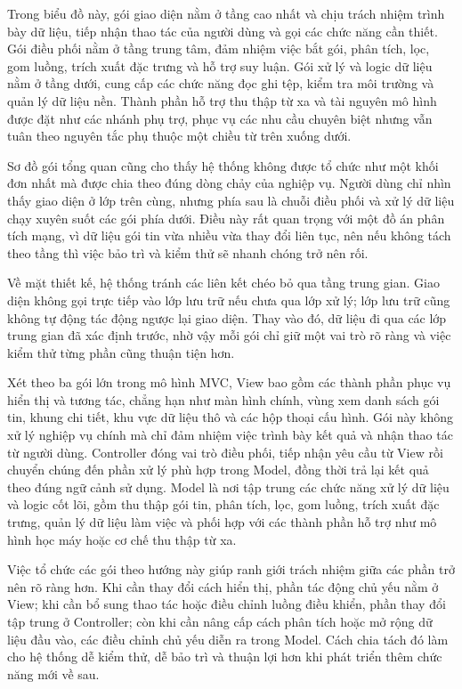 \documentclass[../DoAn.tex]{subfiles}
\begin{document}
Trong biểu đồ này, gói giao diện nằm ở tầng cao nhất và chịu trách nhiệm trình bày dữ liệu, tiếp nhận thao tác của người dùng và gọi các chức năng cần thiết. Gói điều phối nằm ở tầng trung tâm, đảm nhiệm việc bắt gói, phân tích, lọc, gom luồng, trích xuất đặc trưng và hỗ trợ suy luận. Gói xử lý và logic dữ liệu nằm ở tầng dưới, cung cấp các chức năng đọc ghi tệp, kiểm tra môi trường và quản lý dữ liệu nền. Thành phần hỗ trợ thu thập từ xa và tài nguyên mô hình được đặt như các nhánh phụ trợ, phục vụ các nhu cầu chuyên biệt nhưng vẫn tuân theo nguyên tắc phụ thuộc một chiều từ trên xuống dưới.

Sơ đồ gói tổng quan cũng cho thấy hệ thống không được tổ chức như một khối đơn nhất mà được chia theo đúng dòng chảy của nghiệp vụ. Người dùng chỉ nhìn thấy giao diện ở lớp trên cùng, nhưng phía sau là chuỗi điều phối và xử lý dữ liệu chạy xuyên suốt các gói phía dưới. Điều này rất quan trọng với một đồ án phân tích mạng, vì dữ liệu gói tin vừa nhiều vừa thay đổi liên tục, nên nếu không tách theo tầng thì việc bảo trì và kiểm thử sẽ nhanh chóng trở nên rối.

Về mặt thiết kế, hệ thống tránh các liên kết chéo bỏ qua tầng trung gian. Giao diện không gọi trực tiếp vào lớp lưu trữ nếu chưa qua lớp xử lý; lớp lưu trữ cũng không tự động tác động ngược lại giao diện. Thay vào đó, dữ liệu đi qua các lớp trung gian đã xác định trước, nhờ vậy mỗi gói chỉ giữ một vai trò rõ ràng và việc kiểm thử từng phần cũng thuận tiện hơn.

Xét theo ba gói lớn trong mô hình MVC, View bao gồm các thành phần phục vụ hiển thị và tương tác, chẳng hạn như màn hình chính, vùng xem danh sách gói tin, khung chi tiết, khu vực dữ liệu thô và các hộp thoại cấu hình. Gói này không xử lý nghiệp vụ chính mà chỉ đảm nhiệm việc trình bày kết quả và nhận thao tác từ người dùng. Controller đóng vai trò điều phối, tiếp nhận yêu cầu từ View rồi chuyển chúng đến phần xử lý phù hợp trong Model, đồng thời trả lại kết quả theo đúng ngữ cảnh sử dụng. Model là nơi tập trung các chức năng xử lý dữ liệu và logic cốt lõi, gồm thu thập gói tin, phân tích, lọc, gom luồng, trích xuất đặc trưng, quản lý dữ liệu làm việc và phối hợp với các thành phần hỗ trợ như mô hình học máy hoặc cơ chế thu thập từ xa.

Việc tổ chức các gói theo hướng này giúp ranh giới trách nhiệm giữa các phần trở nên rõ ràng hơn. Khi cần thay đổi cách hiển thị, phần tác động chủ yếu nằm ở View; khi cần bổ sung thao tác hoặc điều chỉnh luồng điều khiển, phần thay đổi tập trung ở Controller; còn khi cần nâng cấp cách phân tích hoặc mở rộng dữ liệu đầu vào, các điều chỉnh chủ yếu diễn ra trong Model. Cách chia tách đó làm cho hệ thống dễ kiểm thử, dễ bảo trì và thuận lợi hơn khi phát triển thêm chức năng mới về sau.
\end{document}
